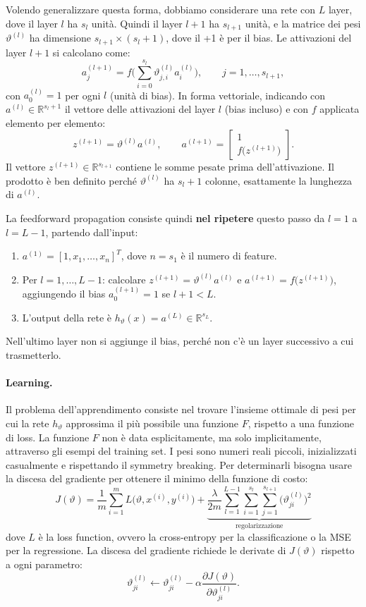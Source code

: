 Volendo generalizzare questa forma, dobbiamo considerare una rete con $L$ layer, dove il layer $l$ ha $s_l$ unità. Quindi il layer $l+1$ ha $s_{l+1}$ unità, e la matrice dei pesi $\vartheta^{(l)}$ ha dimensione $s_{l+1} \times (s_l + 1)$, dove il +1 è per il bias. Le attivazioni del layer $l+1$ si calcolano come:
\[
a_j^{(l+1)} = f\Big(\sum_{i=0}^{s_l}\vartheta_{j,i}^{(l)}a_i^{(l)}\Big), \qquad j = 1, \dots, s_{l+1},
\]
con $a_0^{(l)} = 1$ per ogni $l$ (unità di bias). In forma vettoriale, indicando con $a^{(l)} \in \mathbb{R}^{s_l+1}$ il vettore delle attivazioni del layer $l$ (bias incluso) e con $f$ applicata elemento per elemento:
\[
z^{(l+1)} = \vartheta^{(l)}a^{(l)}, \qquad a^{(l+1)} = \begin{bmatrix} 1 \\ f\big(z^{(l+1)}\big) \end{bmatrix}.
\]
Il vettore $z^{(l+1)} \in \mathbb{R}^{s_{l+1}}$ contiene le somme pesate prima dell'attivazione. Il prodotto è ben definito perché $\vartheta^{(l)}$ ha $s_l + 1$ colonne, esattamente la lunghezza di $a^{(l)}$.

La feedforward propagation consiste quindi \textbf{nel ripetere} questo passo da $l = 1$ a $l = L-1$, partendo dall'input:
\begin{enumerate}
    \item $a^{(1)} = [1, x_1, \dots, x_n]^T$, dove $n = s_1$ è il numero di feature.
    \item Per $l = 1, \dots, L-1$: calcolare $z^{(l+1)} = \vartheta^{(l)}a^{(l)}$ e $a^{(l+1)} = f\big(z^{(l+1)}\big)$, aggiungendo il bias $a_0^{(l+1)} = 1$ se $l+1 < L$.
    \item L'output della rete è $h_\vartheta(x) = a^{(L)} \in \mathbb{R}^{s_L}$.
\end{enumerate}
Nell'ultimo layer non si aggiunge il bias, perché non c'è un layer successivo a cui trasmetterlo.

\paragraph{Learning.}
Il problema dell'apprendimento consiste nel trovare l'insieme ottimale di pesi per cui la rete $h_\vartheta$ approssima il più possibile una funzione $F$, rispetto a una funzione di loss. La funzione $F$ non è data esplicitamente, ma solo implicitamente, attraverso gli esempi del training set. I pesi sono numeri reali piccoli, inizializzati casualmente e rispettando il symmetry breaking. Per determinarli bisogna usare la discesa del gradiente per ottenere il minimo della funzione di costo:
\[
J(\vartheta) = \frac{1}{m}\sum_{i=1}^{m}L\big(\vartheta, x^{(i)}, y^{(i)}\big) + \underbrace{\frac{\lambda}{2m}\sum_{l=1}^{L-1}\sum_{i=1}^{s_l}\sum_{j=1}^{s_{l+1}}\big(\vartheta_{ji}^{(l)}\big)^2}_{\text{regolarizzazione}}
\]
dove $L$ è la loss function, ovvero la cross-entropy per la classificazione o la MSE per la regressione. La discesa del gradiente richiede le derivate di $J(\vartheta)$ rispetto a ogni parametro:
\[
\vartheta_{ji}^{(l)} \leftarrow \vartheta_{ji}^{(l)} - \alpha\frac{\partial J(\vartheta)}{\partial \vartheta_{ji}^{(l)}}.
\]

